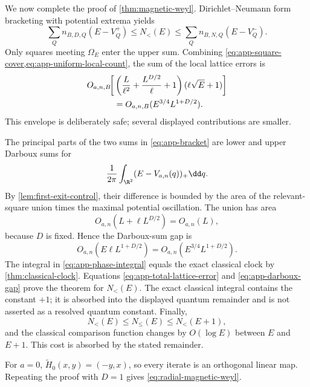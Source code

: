 We now complete the proof of \cref{thm:magnetic-weyl}.  Dirichlet--Neumann
form bracketing with potential extrema yields
\begin{equation}
 \sum_Q n_{B,D,Q}(E-V_Q^+)
 \leq N_{<}(E)
 \leq\sum_Q n_{B,N,Q}(E-V_Q^-).
 \label{eq:app-bracket}
\end{equation}
Only squares meeting \(\Omega_E\) enter the upper sum.  Combining
\cref{eq:app-square-cover,eq:app-uniform-local-count}, the sum of the local
lattice errors is
\begin{align}
 O_{a,n,B}\!\bigg[&
 \left(\frac{L}{\ell^2}+\frac{L^{D/2}}{\ell}+1\right)
 (\ell\sqrt E+1)\bigg]
 \notag\\
 &=O_{a,n,B}(E^{3/4}L^{1+D/2}).
 \label{eq:app-total-lattice-error}
\end{align}
This envelope is deliberately safe; several displayed contributions are
smaller.

The principal parts of the two sums in \cref{eq:app-bracket} are lower and
upper Darboux sums for
\begin{equation}
 \frac1{2\pi}\int_{\R^2}(E-V_{a,n}(q))_+\dd q.
 \label{eq:app-phase-integral}
\end{equation}
By \cref{lem:first-exit-control}, their difference is bounded by the area of
the relevant-square union times the maximal potential oscillation.  The
union has area
\begin{equation}
 O_{a,n}(L+\ell L^{D/2})=O_{a,n}(L),
\end{equation}
because \(D\) is fixed.  Hence the Darboux-sum gap is
\begin{equation}
 O_{a,n}(E\ell L^{1+D/2})
 =O_{a,n}(E^{3/4}L^{1+D/2}).
 \label{eq:app-darboux-gap}
\end{equation}
The integral in \cref{eq:app-phase-integral} equals the exact classical
clock by \cref{thm:classical-clock}.  Equations
\eqref{eq:app-total-lattice-error} and \eqref{eq:app-darboux-gap} prove the
theorem for \(N_{<}(E)\).  The exact classical integral contains the
constant \(+1\); it is absorbed into the displayed quantum remainder and is
not asserted as a resolved quantum constant.  Finally,
\begin{equation}
 N_{<}(E)\leq N_{\leq}(E)\leq N_{<}(E+1),
\end{equation}
and the classical comparison function changes by \(O(\log E)\) between
\(E\) and \(E+1\).  This cost is absorbed by the stated remainder.

For \(a=0\), \(\widetilde H_0(x,y)=(-y,x)\), so every iterate is an
orthogonal linear map.  Repeating the proof with \(D=1\) gives
\cref{eq:radial-magnetic-weyl}.

